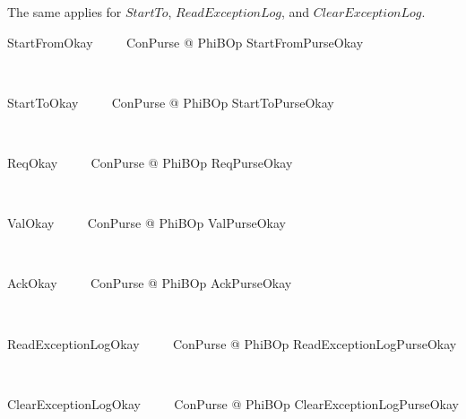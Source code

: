 \bigskip %

\noindent The same applies for $StartTo$, $ReadExceptionLog$, and $ClearExceptionLog$.

\begin{LNewSDef}
\begin{zed}
   StartFromOkay ~~~~ \exists \Delta ConPurse @ PhiBOp \land StartFromPurseOkay
\end{zed}~\end{LNewSDef}

\begin{LNewSDef}
\begin{zed}
   StartToOkay ~~~~ \exists \Delta ConPurse @ PhiBOp \land StartToPurseOkay
\end{zed}~\end{LNewSDef}

\begin{LNewSDef}
\begin{zed}
   ReqOkay ~~~~ \exists \Delta ConPurse @ PhiBOp \land ReqPurseOkay
\end{zed}~\end{LNewSDef}
%
\begin{LNewSDef}
\begin{zed}
   ValOkay ~~~~ \exists \Delta ConPurse @ PhiBOp \land ValPurseOkay
\end{zed}~\end{LNewSDef}
%
\begin{LNewSDef}
\begin{zed}
   AckOkay ~~~~ \exists \Delta ConPurse @ PhiBOp \land AckPurseOkay
\end{zed}~\end{LNewSDef}

\begin{LNewSDef}
\begin{zed}
   ReadExceptionLogOkay ~~~~ \exists \Delta ConPurse @ PhiBOp \land ReadExceptionLogPurseOkay
\end{zed}~\end{LNewSDef}

\begin{LNewSDef}
\begin{zed}
   ClearExceptionLogOkay ~~~~ \exists \Delta ConPurse @ PhiBOp \land ClearExceptionLogPurseOkay
\end{zed}~\end{LNewSDef}

